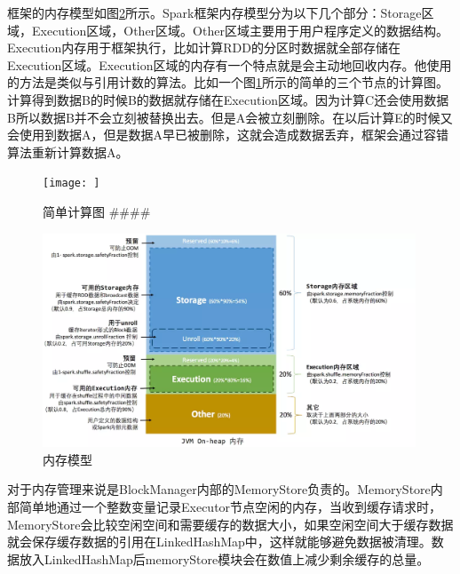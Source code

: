 框架的内存模型如图\ref{fig:memory-model}所示。Spark框架内存模型分为以下几个部分：Storage区域，Execution区域，Other区域。Other区域主要用于用户程序定义的数据结构。Execution内存用于框架执行，比如计算RDD的分区时数据就全部存储在Execution区域。Execution区域的内存有一个特点就是会主动地回收内存。他使用的方法是类似与引用计数的算法。比如一个图\ref{fig:simpl-dag}所示的简单的三个节点的计算图。计算得到数据B的时候B的数据就存储在Execution区域。因为计算C还会使用数据B所以数据B并不会立刻被替换出去。但是A会被立刻删除。在以后计算E的时候又会使用到数据A，但是数据A早已被删除，这就会造成数据丢弃，框架会通过容错算法重新计算数据A。

\begin{figure}
    \centering
    \texttt{[image: ]}
    \caption{简单计算图 ####}
    \label{fig:simpl-dag}
\end{figure}

\begin{figure}
    \centering
    \includegraphics[width=0.99\textwidth]{Img/memory-model.png}
    \caption{内存模型}
    \label{fig:memory-model}
\end{figure}

对于内存管理来说是BlockManager内部的MemoryStore负责的。MemoryStore内部简单地通过一个整数变量记录Executor节点空闲的内存，当收到缓存请求时，MemoryStore会比较空闲空间和需要缓存的数据大小，如果空闲空间大于缓存数据就会保存缓存数据的引用在LinkedHashMap中，这样就能够避免数据被清理。数据放入LinkedHashMap后memoryStore模块会在数值上减少剩余缓存的总量。

